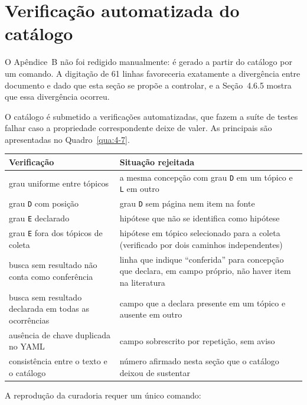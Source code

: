 \section{Verificação automatizada do catálogo}

O Apêndice~B não foi redigido manualmente: é gerado a partir do catálogo por um comando. A digitação de 61 linhas favoreceria exatamente a divergência entre documento e dado que esta seção se propõe a controlar, e a Seção~4.6.5 mostra que essa divergência ocorreu.

O catálogo é submetido a verificações automatizadas, que fazem a suíte de testes falhar caso a propriedade correspondente deixe de valer. As principais são apresentadas no Quadro~\ref{qua:4-7}.

\begin{quadro}[htbp]
\caption{Principais verificações automatizadas do catálogo}\label{qua:4-7}
\footnotesize
\begin{tabularx}{\textwidth}{|X|X|}
\hline
\textbf{Verificação} & \textbf{Situação rejeitada} \\ \hline
grau uniforme entre tópicos & a mesma concepção com grau \texttt{D} em um tópico e \texttt{L} em outro \\ \hline
grau \texttt{D} com posição & grau \texttt{D} sem página nem item na fonte \\ \hline
grau \texttt{E} declarado & hipótese que não se identifica como hipótese \\ \hline
grau \texttt{E} fora dos tópicos de coleta & hipótese em tópico selecionado para a coleta (verificado por dois caminhos independentes) \\ \hline
busca sem resultado não conta como conferência & linha que indique ``conferida'' para concepção que declara, em campo próprio, não haver item na literatura \\ \hline
busca sem resultado declarada em todas as ocorrências & campo que a declara presente em um tópico e ausente em outro \\ \hline
ausência de chave duplicada no YAML & campo sobrescrito por repetição, sem aviso \\ \hline
consistência entre o texto e o catálogo & número afirmado nesta seção que o catálogo deixou de sustentar \\ \hline
\end{tabularx}
\end{quadro}

A reprodução da curadoria requer um único comando:

